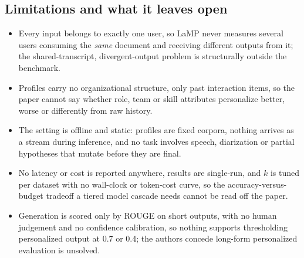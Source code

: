 \subsection{Limitations and what it leaves open}
\begin{itemize}[leftmargin=*, itemsep=1pt, topsep=2pt]
  \item Every input belongs to exactly one user, so LaMP never measures several users consuming the \emph{same} document and receiving different outputs from it; the shared-transcript, divergent-output problem is structurally outside the benchmark.
  \item Profiles carry no organizational structure, only past interaction items, so the paper cannot say whether role, team or skill attributes personalize better, worse or differently from raw history.
  \item The setting is offline and static: profiles are fixed corpora, nothing arrives as a stream during inference, and no task involves speech, diarization or partial hypotheses that mutate before they are final.
  \item No latency or cost is reported anywhere, results are single-run, and $k$ is tuned per dataset with no wall-clock or token-cost curve, so the accuracy-versus-budget tradeoff a tiered model cascade needs cannot be read off the paper.
  \item Generation is scored only by ROUGE on short outputs, with no human judgement and no confidence calibration, so nothing supports thresholding personalized output at 0.7 or 0.4; the authors concede long-form personalized evaluation is unsolved.
\end{itemize}
